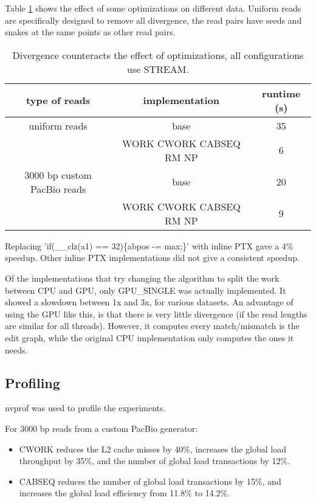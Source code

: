 \documentclass[../thesis.tex]{subfiles}
\begin{document}
Table \ref{tbl:daligner4} shows the effect of some optimizations on different data.
Uniform reads are specifically designed to remove all divergence, the read pairs have seeds and snakes at the same points as other read pairs.

\begin{table}
\centering
\caption{Divergence counteracts the effect of optimizations, all configurations use STREAM.}
\label{tbl:daligner4}
\begin{tabular}{c|c|c}
type of reads & implementation & runtime (s) \\ \hline
uniform reads & base & 35 \\
& WORK CWORK CABSEQ RM NP & 6 \\ \hline
3000 bp custom PacBio reads & base & 20 \\
& WORK CWORK CABSEQ RM NP & 9 \\
\end{tabular}
\end{table}


Replacing 'if(\_\_clz(a1) == 32)\{abpos -= max;\}' with inline PTX gave a 4\% speedup.
Other inline PTX implementations did not give a consistent speedup.

Of the implementations that try changing the algorithm to split the work between CPU and GPU, only GPU\_SINGLE was actually implemented.
It showed a slowdown between 1x and 3x, for various datasets.
An advantage of using the GPU like this, is that there is very little divergence (if the read lengths are similar for all threads).
However, it computes every match/mismatch is the edit graph, while the original CPU implementation only computes the ones it needs.

\newpage

\subsection{Profiling}
nvprof \cite{nvprof} was used to profile the experiments.

For 3000 bp reads from a custom PacBio generator:
\begin{itemize}
\item CWORK reduces the L2 cache misses by 40\%, increases the global load throughput by 35\%, and the number of global load transactions by 12\%. \vspace{-10pt}
\item CABSEQ reduces the number of global load transactions by 15\%, and increases the global load efficiency from 11.8\% to 14.2\%.
\end{itemize}
\end{document}
